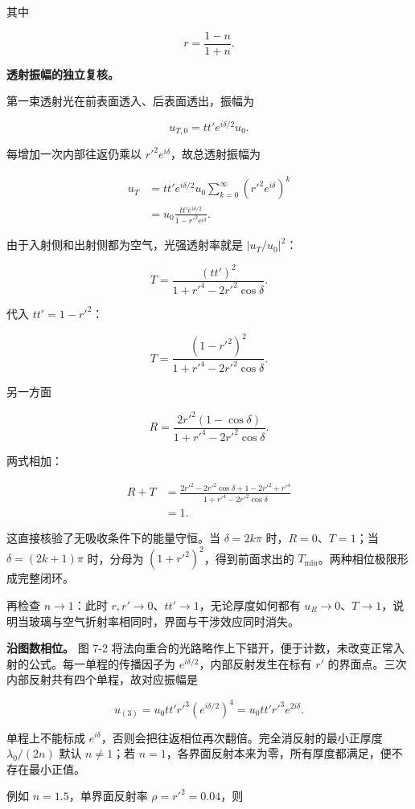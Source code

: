 \documentclass[12pt,a4paper,UTF8]{ctexart}
\begin{document}
其中

\[r=\frac{1-n}{1+n}.\]

\textbf{透射振幅的独立复核。}

第一束透射光在前表面透入、后表面透出，振幅为

\[u_{T,0}=tt'e^{i\delta/2}u_0.\]

每增加一次内部往返仍乘以 \(r'^2e^{i\delta}\)，故总透射振幅为

\[
\begin{aligned}
u_T
&=tt'e^{i\delta/2}u_0
\sum_{k=0}^{\infty}(r'^2e^{i\delta})^k\\
&=u_0\frac{tt'e^{i\delta/2}}{1-r'^2e^{i\delta}}.
\end{aligned}
\]

由于入射侧和出射侧都为空气，光强透射率就是 \(|u_T/u_0|^2\)：

\[T=\frac{(tt')^2}{1+r'^4-2r'^2\cos\delta}.\]

代入 \(tt'=1-r'^2\)：

\[T=\frac{(1-r'^2)^2}{1+r'^4-2r'^2\cos\delta}.\]

另一方面

\[R=\frac{2r'^2(1-\cos\delta)}{1+r'^4-2r'^2\cos\delta}.\]

两式相加：

\[
\begin{aligned}
R+T
&=\frac{2r'^2-2r'^2\cos\delta+1-2r'^2+r'^4}
{1+r'^4-2r'^2\cos\delta}\\
&=1.
\end{aligned}
\]

这直接核验了无吸收条件下的能量守恒。当 \(\delta=2k\pi\)
时，\(R=0\)、\(T=1\)；当 \(\delta=(2k+1)\pi\) 时，分母为
\((1+r'^2)^2\)，得到前面求出的 \(T_{\min}\)。两种相位极限形成完整闭环。

再检查 \(n\to1\)：此时 \(r,r'\to0\)、\(tt'\to1\)，无论厚度如何都有
\(u_R\to0\)、\(T\to1\)，说明当玻璃与空气折射率相同时，界面与干涉效应同时消失。

\textbf{沿图数相位。} 图 7-2
将法向重合的光路略作上下错开，便于计数，未改变正常入射的公式。每一单程的传播因子为
\(e^{i\delta/2}\)，内部反射发生在标有 \(r'\)
的界面点。三次内部反射共有四个单程，故对应振幅是

\[u_{(3)}=u_0tt'r'^3(e^{i\delta/2})^4=u_0tt'r'^3e^{2i\delta}.\]

单程上不能标成
\(e^{i\delta}\)，否则会把往返相位再次翻倍。完全消反射的最小正厚度
\(\lambda_0/(2n)\) 默认 \(n\ne1\)；若
\(n=1\)，各界面反射本来为零，所有厚度都满足，便不存在最小正值。

例如 \(n=1.5\)，单界面反射率 \(\rho=r'^2=0.04\)，则
\end{document}
